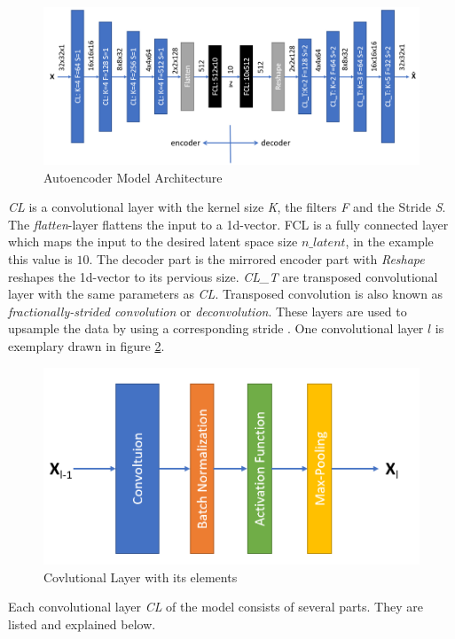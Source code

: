 \documentclass[12pt,DIV14,BCOR12mm,a4paper,footexclude,headinclude,halfparskip-,twoside,openright,openany,cleardoubleempty,idxtotoc,bibtotoc]{scrreprt} %
\numberwithin{equation}{chapter}
\begin{document}
\begin{figure}[htb!]
	\centering
	\includegraphics[width=0.9\linewidth]{Graphiken/Autoencoder_Model}
	\caption{Autoencoder Model Architecture}
	\label{fig:AE_ModelArchitecture}
\end{figure}
\textit{CL} is a convolutional layer with the kernel size \textit{K}, the filters \textit{F} and the Stride \textit{S}. The \textit{flatten}-layer flattens the input to a 1d-vector. FCL is a fully connected layer which maps the input to the desired latent space size $n\_latent$, in the example this value is $10$. The decoder part is the mirrored encoder part with \textit{Reshape} reshapes the 1d-vector to its pervious size. \textit{CL\_T} are transposed convolutional layer with the same parameters as \textit{CL}. Transposed convolution is also known as \textit{fractionally-strided convolution} or \textit{deconvolution}. These layers are used to upsample the data by using a corresponding stride \cite{DeepLearningDive}. One convolutional layer $l$ is exemplary drawn in figure \ref{fig:Conv_layer}.
\begin{figure}[htb!]
	\centering
	\includegraphics[width=0.5\linewidth]{Graphiken/ConvolutionalLayer}
	\caption{Covlutional Layer with its elements}
	\label{fig:Conv_layer}
\end{figure}
Each convolutional layer \textit{CL} of the model consists of several parts. They are listed and explained below.\\
\end{document}
